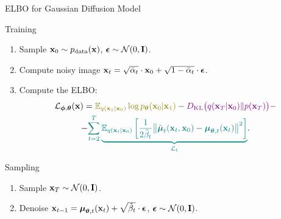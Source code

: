 \documentclass{beamer}
\renewcommand{\eqpause}{}
\begin{document}
\begin{frame}{ELBO for Gaussian Diffusion Model}
    \begin{block}{Training}
        \begin{enumerate}
            \item Sample $\mathbf{x}_0 \sim p_{\text{data}}(\mathbf{x})$, $\boldsymbol{\epsilon} \sim \mathcal{N}(0, \mathbf{I})$.
            \item Compute noisy image $\mathbf{x}_t = \sqrt{\bar{\alpha}_t} \cdot \mathbf{x}_0 + \sqrt{1 - \bar{\alpha}_t} \cdot \boldsymbol{\epsilon}$.
            \item Compute the ELBO:
            \vspace{-0.3cm}
            \begin{multline*}
                \cL_{\bphi, \btheta}(\bx) =  {\color{olive}\bbE_{q(\bx_1 | \bx_0)} \log \pt(\bx_0 | \bx_1)} - {\color{violet}\KL\bigl(q(\bx_T | \bx_0) \| p(\bx_T)\bigr)} - \\
                - {\color{teal}\sum_{t=2}^T \underbrace{ \bbE_{q(\bx_t | \bx_0)} \left[\frac{1}{2\tilde{\beta}_t} \bigl\| \tilde{\bmu}_t(\bx_t, \bx_0) - \bmu_{\btheta, t}(\bx_t) \bigr\|^2  \right]}_{\cL_t}}.
            \end{multline*}
            \vspace{-0.7cm}
        \end{enumerate}
    \end{block}
    \eqpause
    \begin{block}{Sampling}
        \begin{enumerate}
            \item Sample $\mathbf{x}_T \sim \mathcal{N}(0, \mathbf{I})$.
            \item Denoise $\mathbf{x}_{t - 1} = \boldsymbol{\mu}_{\boldsymbol{\theta}, t}(\mathbf{x}_t) +  \sqrt{\tilde{\beta}_t} \cdot \boldsymbol{\epsilon}$, $\boldsymbol{\epsilon} \sim \mathcal{N}(0, \mathbf{I})$.
        \end{enumerate}
    \end{block}
\end{frame}
\end{document}
